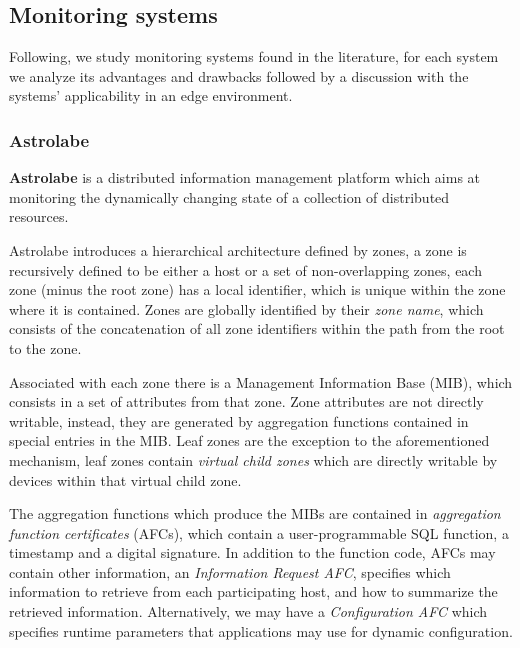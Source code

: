 


\subsection{Monitoring systems}

Following, we study monitoring systems found in the literature, for each system we analyze its advantages and drawbacks followed by a discussion with the systems' applicability in an edge environment.

\subsubsection{Astrolabe}

\textbf{Astrolabe} \cite{Renesse2003} is a distributed information management platform which aims at monitoring the dynamically changing state of a collection of distributed resources. 

Astrolabe introduces a hierarchical architecture defined by zones, a zone is recursively defined to be either a host or a set of non-overlapping zones, each zone (minus the root zone) has a local identifier, which is unique within the zone where it is contained. Zones are globally identified by their \textit{zone name}, which consists of the concatenation of all zone identifiers within the path from the root to the zone.

Associated with each zone there is a Management Information Base (MIB), which consists in a set of attributes from that zone. Zone attributes are not directly writable, instead, they are generated by aggregation functions contained in special entries in the MIB. Leaf zones are the exception to the aforementioned mechanism, leaf zones contain \textit{virtual child zones} which are directly writable by devices within that virtual child zone.

The aggregation functions which produce the MIBs are contained in \textit{aggregation function certificates} (AFCs), which contain a user-programmable SQL function, a timestamp and a digital signature. In addition to the function code, AFCs may contain other information, an \textit{Information Request AFC},  specifies which information to retrieve from each participating host, and how to summarize the retrieved information. Alternatively, we may have a \textit{Configuration AFC} which specifies runtime parameters that applications may use for dynamic configuration.

